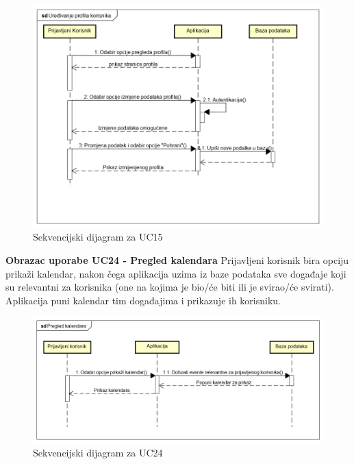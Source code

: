 				
				\begin{figure}[H]
					\begin{center}
						\includegraphics[width=15cm]{slike/uc15_fixed.PNG}
					\end{center}
					\caption{Sekvencijski dijagram za UC15}
					\label{fig:uc15}
				\end{figure}
				
				
				
			\eject
				 \textbf{Obrazac uporabe UC24 - Pregled kalendara}
			\newline
			Prijavljeni korisnik bira opciju prikaži kalendar, nakon čega aplikacija uzima iz baze podataka sve događaje koji su relevantni za korisnika (one na kojima je bio/će biti ili je svirao/će svirati). Aplikacija puni kalendar tim događajima i prikazuje ih korisniku.\\
			
			\begin{figure}[H]
				\begin{center}
					\includegraphics[width=15cm]{slike/uc25.PNG}
				\end{center}
				\caption{Sekvencijski dijagram za UC24}
				\label{fig:uc25}
			\end{figure}
	
